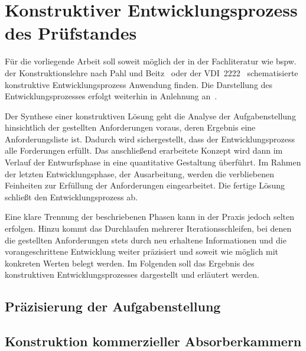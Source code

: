 

\chapter{Konstruktiver Entwicklungsprozess des Prüfstandes}\label{cha:3}

Für die vorliegende Arbeit soll soweit möglich der in der Fachliteratur wie bspw. der Konstruktionslehre nach Pahl und Beitz~\cite{Pahl_Beitz_Konstruktionslehre} oder der VDI~2222~\cite{VDI_2222-1} schematisierte konstruktive Entwicklungsprozess Anwendung finden. Die Darstellung des Entwicklungsprozesses erfolgt weiterhin in Anlehnung an~\cite{Projektarbeit}.
\par
\vspace{\linespace}
Der Synthese einer konstruktiven Lösung geht die Analyse der Aufgabenstellung hinsichtlich der gestellten Anforderungen voraus, deren Ergebnis eine Anforderungsliste ist. Dadurch wird sichergestellt, dass der Entwicklungsprozess alle Forderungen erfüllt. Das anschließend erarbeitete Konzept wird dann im Verlauf der Entwurfsphase in eine quantitative Gestaltung überführt. Im Rahmen der letzten Entwicklungsphase, der Ausarbeitung, werden die verbliebenen Feinheiten zur Erfüllung der Anforderungen eingearbeitet. Die fertige Lösung schließt den Entwicklungsprozess ab.
\par
\vspace{\linespace}
Eine klare Trennung der beschriebenen Phasen kann in der Praxis jedoch selten erfolgen. Hinzu kommt das Durchlaufen mehrerer Iterationsschleifen, bei denen die gestellten Anforderungen stets durch neu erhaltene Informationen und die vorangeschrittene Entwicklung weiter präzisiert und soweit wie möglich mit konkreten Werten belegt werden. Im Folgenden soll das Ergebnis des konstruktiven Entwicklungsprozesses dargestellt und erläutert werden.   


\section{Präzisierung der Aufgabenstellung}\label{cha:3_Praezisierung_Aufgabenstellung}





\section{Konstruktion kommerzieller Absorberkammern}\label{cha:3_Konstruktion_kommerzieller_Absorberkammern}


